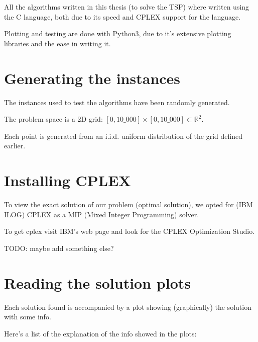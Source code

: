 All the algorithms written in this thesis (to solve the TSP) where written using the C language, both due to its speed and CPLEX support for the language.

Plotting and testing are done with Python3, due to it's extensive plotting libraries and the ease in writing it.

\section{Generating the instances}

The instances used to test the algorithms have been randomly generated.

The problem space is a 2D grid: $[0,10\_000]\times[0,10\_000]\subset\mathbb{R}^2$.

Each point is generated from an i.i.d. uniform distribution of the grid defined earlier.

\section{Installing CPLEX}

To view the exact solution of our problem (optimal solution), we opted for (IBM ILOG) CPLEX as a MIP (Mixed Integer Programming) solver.

To get cplex visit IBM's web page and look for the CPLEX Optimization Studio.

TODO: maybe add something else?


\section{Reading the solution plots}

Each solution found is accompanied by a plot showing (graphically) the solution with some info.

Here's a list of the explanation of the info showed in the plots:

